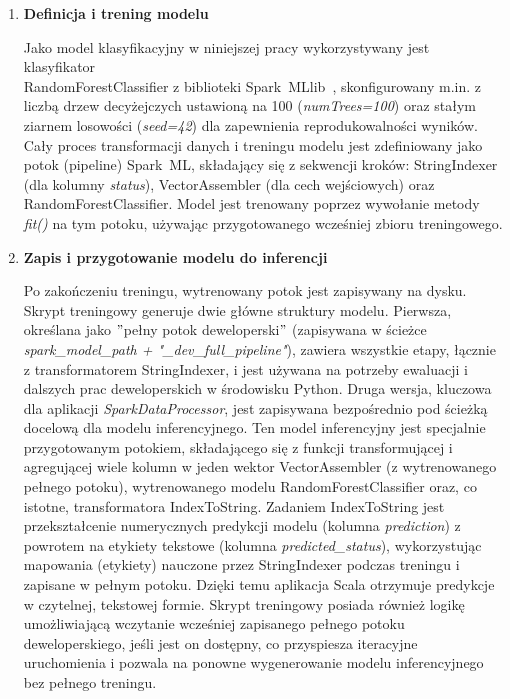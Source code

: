 \begin{enumerate}
    \item \textbf{Definicja i trening modelu}

Jako model klasyfikacyjny w niniejszej pracy wykorzystywany jest klasyfikator \\ RandomForestClassifier z biblioteki \mbox{Spark MLlib}~\cite{spark_mllib_reference}, skonfigurowany m.in. z liczbą drzew decyżejczych ustawioną na 100 (\textit{numTrees=100}) oraz stałym ziarnem losowości (\textit{seed=42}) dla zapewnienia reprodukowalności wyników. Cały proces transformacji danych i treningu modelu jest zdefiniowany jako potok (pipeline) \mbox{Spark ML}, składający się z sekwencji kroków: StringIndexer (dla kolumny \textit{status}), VectorAssembler (dla cech wejściowych) oraz RandomForestClassifier. Model jest trenowany poprzez wywołanie metody \textit{fit()} na tym potoku, używając przygotowanego wcześniej zbioru treningowego.

    \item \textbf{Zapis i przygotowanie modelu do inferencji}

Po zakończeniu treningu, wytrenowany potok jest zapisywany na dysku. Skrypt treningowy generuje dwie główne struktury modelu. Pierwsza, określana jako \("\)pełny potok deweloperski\("\) (zapisywana w ścieżce \textit{spark\_model\_path + "\_dev\_full\_pipeline"}), zawiera wszystkie etapy, łącznie z transformatorem StringIndexer, i jest używana na potrzeby ewaluacji i dalszych prac deweloperskich w środowisku Python. Druga wersja, kluczowa dla aplikacji \textit{SparkDataProcessor}, jest zapisywana bezpośrednio pod ścieżką docelową dla modelu inferencyjnego. Ten model inferencyjny jest specjalnie przygotowanym potokiem, składającego się z funkcji transformującej i agregującej wiele kolumn w jeden wektor VectorAssembler (z wytrenowanego pełnego potoku), wytrenowanego modelu RandomForestClassifier oraz, co istotne, transformatora IndexToString. Zadaniem IndexToString jest przekształcenie numerycznych predykcji modelu (kolumna \textit{prediction}) z powrotem na etykiety tekstowe (kolumna \textit{predicted\_status}), wykorzystując mapowania (etykiety) nauczone przez StringIndexer podczas treningu i zapisane w pełnym potoku. Dzięki temu aplikacja Scala otrzymuje predykcje w czytelnej, tekstowej formie. Skrypt treningowy posiada również logikę umożliwiającą wczytanie wcześniej zapisanego pełnego potoku deweloperskiego, jeśli jest on dostępny, co przyspiesza iteracyjne uruchomienia i pozwala na ponowne wygenerowanie modelu inferencyjnego bez pełnego treningu.


\end{enumerate}
